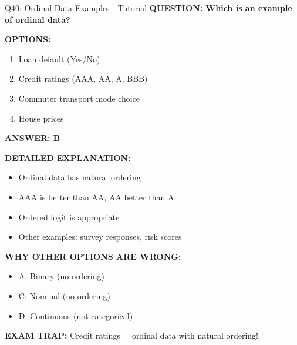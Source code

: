 \documentclass[8pt]{beamer}
\begin{document}
	\begin{frame}{Q40: Ordinal Data Examples - Tutorial}
		\fontsize{6.5}{7.5}\selectfont
		\textbf{QUESTION: Which is an example of ordinal data?}
		
		\vspace{0.1cm}
		\textbf{OPTIONS:}
		\begin{enumerate}
			\item Loan default (Yes/No)
			\item Credit ratings (AAA, AA, A, BBB)
			\item Commuter transport mode choice
			\item House prices
		\end{enumerate}
		
		\vspace{0.1cm}
		\textcolor{myblue}{\textbf{ANSWER: B}}
		
		\vspace{0.1cm}
		\textbf{DETAILED EXPLANATION:}
		\begin{itemize}
			\item Ordinal data has natural ordering
			\item AAA is better than AA, AA better than A
			\item Ordered logit is appropriate
			\item Other examples: survey responses, risk scores
		\end{itemize}
		
		\vspace{0.1cm}
		\textcolor{myred}{\textbf{WHY OTHER OPTIONS ARE WRONG:}}
		\begin{itemize}
			\item \textcolor{myred}{A:} Binary (no ordering)
			\item \textcolor{myred}{C:} Nominal (no ordering)
			\item \textcolor{myred}{D:} Continuous (not categorical)
		\end{itemize}
		
		\textcolor{myred}{\textbf{EXAM TRAP:}} Credit ratings = \textcolor{myblue}{ordinal data} with natural ordering!
	\end{frame}
	
\end{document}
